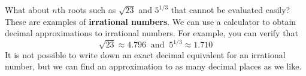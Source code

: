 \documentclass[10pt,]{book}
\newcommand{\terminology}[1]{\textbf{#1}}
\theoremstyle{plain}
\theoremstyle{definition}
\theoremstyle{definition}
\theoremstyle{definition}
\theoremstyle{definition}
\theoremstyle{definition}
\numberwithin{equation}{section}
\begin{document}
    What about \(n\)th roots such as \(\sqrt{23}\) and \(5^{1/3}\) that cannot be evaluated easily? These are examples of \terminology{irrational numbers}. We can use a calculator to obtain decimal approximations to irrational numbers. For example, you can verify that
    \begin{equation*}\sqrt{23} \approx 4.796 ~ \text{ and } ~ 5^{1/3}\approx 1.710\end{equation*}
    It is not possible to write down an exact decimal equivalent for an irrational number, but we can find an approximation to as many decimal places as we like.
%
\typeout{************************************************}
\typeout{************************************************}
\end{document}
